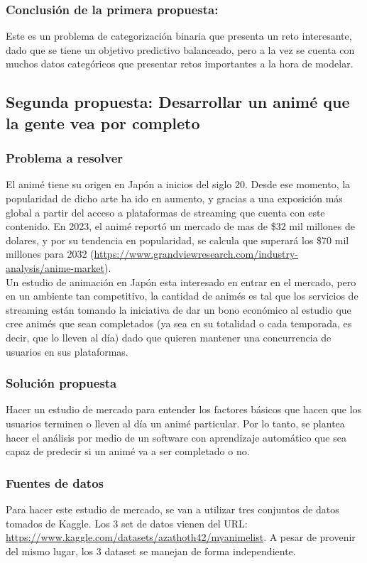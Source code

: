 \documentclass[a4paper]{article}
\begin{document}
\subsubsection{Conclusión de la primera propuesta:}
Este es un problema de categorización binaria que presenta un reto interesante, dado que se tiene un objetivo predictivo balanceado, pero a la vez se cuenta con muchos datos categóricos que presentar retos importantes a la hora de modelar.



\subsection{Segunda propuesta: Desarrollar un animé que la gente vea por completo}
\subsubsection{Problema a resolver}
El animé tiene su origen en Japón a inicios del siglo 20. Desde ese momento, la popularidad de dicho arte ha ido en aumento, y gracias a una exposición más global a partir del acceso a plataformas de streaming que cuenta con este contenido. En 2023, el animé reportó un mercado de mas de \$32 mil millones de dolares, y por su tendencia en popularidad, se calcula que superará los \$70 mil millones para 2032 (\url{https://www.grandviewresearch.com/industry-analysis/anime-market}).\\

Un estudio de animación en Japón esta interesado en entrar en el mercado, pero en un ambiente tan competitivo, la cantidad de animés es tal que los servicios de streaming están tomando la iniciativa de dar un bono económico al estudio que cree animés que sean completados (ya sea en su totalidad o cada temporada, es decir, que lo lleven al día) dado que quieren mantener una concurrencia de usuarios en sus plataformas.

\subsubsection{Solución propuesta}
Hacer un estudio de mercado para entender los factores básicos que hacen que los usuarios terminen o lleven al día un animé particular. Por lo tanto, se plantea hacer el análisis por medio de un software con aprendizaje automático que sea capaz de predecir si un animé va a ser completado o no.

\subsubsection{Fuentes de datos}
Para hacer este estudio de mercado, se van a utilizar tres conjuntos de datos tomados de Kaggle. Los 3 set de datos vienen del URL: \url{https://www.kaggle.com/datasets/azathoth42/myanimelist}. A pesar de provenir del mismo lugar, los 3 dataset se manejan de forma independiente.\\
\end{document}
